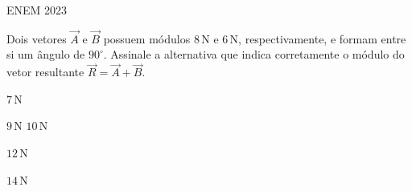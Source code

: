 \documentclass{beamer}
\begin{document}
\CapaIFCE{\ImagemCapa}

\question
  {ENEM 2023}
  {Dois vetores $\vec{A}$ e $\vec{B}$ possuem módulos $8\,\text{N}$ e
   $6\,\text{N}$, respectivamente, e formam entre si um ângulo de
   $90^\circ$. Assinale a alternativa que indica corretamente o módulo
   do vetor resultante $\vec{R} = \vec{A} + \vec{B}$.

   \begin{alternativas}
     \item $7\,\text{N}$
     \item $9\,\text{N}$
     \itemCorreto $10\,\text{N}$
     \item $12\,\text{N}$
     \item $14\,\text{N}$
   \end{alternativas}}
\end{document}
